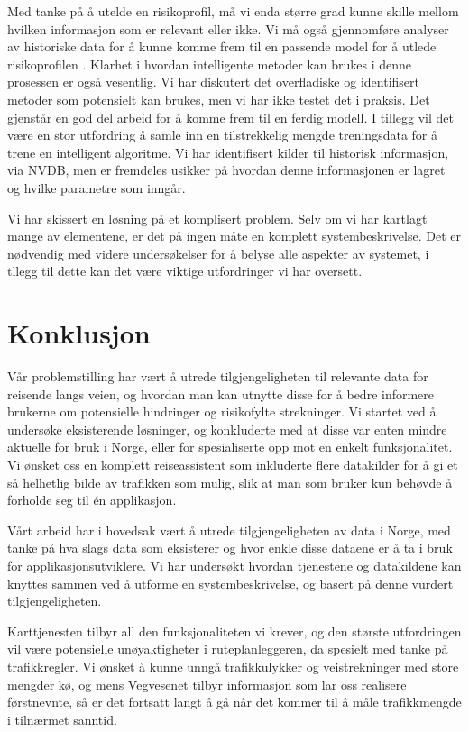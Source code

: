 \documentclass[a4paper,norsk,oneside]{book}
\begin{document}
Med tanke på å utelde en risikoprofil, må vi  enda større grad kunne skille mellom hvilken informasjon som er relevant eller ikke. Vi må også gjennomføre analyser av historiske data for å kunne komme frem til en passende model for å utlede risikoprofilen . Klarhet i hvordan intelligente metoder kan brukes i denne prosessen er også vesentlig.  Vi har diskutert det overfladiske og identifisert metoder som potensielt kan brukes, men vi har ikke testet det i praksis. Det gjenstår en god del arbeid for å komme frem til en ferdig modell. I tillegg vil det være en stor utfordring å samle inn en tilstrekkelig mengde treningsdata for å trene en intelligent algoritme. Vi har identifisert kilder til historisk informasjon, via NVDB, men er fremdeles usikker på hvordan denne informasjonen er lagret og hvilke parametre som inngår.

Vi har skissert en løsning på et komplisert problem. Selv om vi har kartlagt mange av elementene, er det på ingen måte en komplett systembeskrivelse. Det er nødvendig med videre undersøkelser for å belyse alle aspekter av systemet, i tllegg til dette kan det være viktige utfordringer vi har oversett. 

\section{Konklusjon}
\label{sec:konklusjon}

Vår problemstilling har vært å utrede tilgjengeligheten til relevante data for reisende langs veien, og hvordan man kan utnytte disse for å bedre informere brukerne om potensielle hindringer og risikofylte strekninger. Vi startet ved å undersøke eksisterende løsninger, og konkluderte med at disse var enten mindre aktuelle for bruk i Norge, eller for spesialiserte opp mot en enkelt funksjonalitet. Vi ønsket oss en komplett reiseassistent som inkluderte flere datakilder for å gi et så helhetlig bilde av trafikken som mulig, slik at man som bruker kun behøvde å forholde seg til én applikasjon.

Vårt arbeid har i hovedsak vært å utrede tilgjengeligheten av data i Norge, med tanke på hva slags data som eksisterer og hvor enkle disse dataene er å ta i bruk for applikasjonsutviklere. Vi har undersøkt hvordan tjenestene og datakildene kan knyttes sammen ved å utforme en systembeskrivelse, og basert på denne vurdert tilgjengeligheten.

Karttjenesten tilbyr all den funksjonaliteten vi krever, og den største utfordringen vil være potensielle unøyaktigheter i ruteplanleggeren, da spesielt med tanke på trafikkregler. Vi ønsket å kunne unngå trafikkulykker og veistrekninger med store mengder kø, og mens Vegvesenet tilbyr informasjon som lar oss realisere førstnevnte, så er det fortsatt langt å gå når det kommer til å måle trafikkmengde i tilnærmet sanntid.
\end{document}
